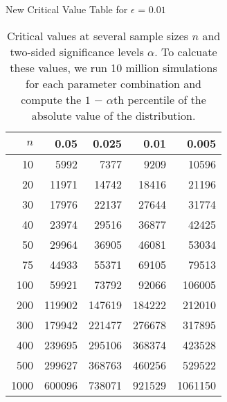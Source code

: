 \begin{table}[ht]
\centering
\caption{New Critical Value Table for $\epsilon$ = $0.01$}
\label{tab:crit_val_eps_.01}
\begin{tabular}{rrrrr}
  \hline
$n$ & 0.05 & 0.025 & 0.01 & 0.005 \\ 
  \hline
10 & 5992 & 7377 & 9209 & 10596 \\ 
  20 & 11971 & 14742 & 18416 & 21196 \\ 
  30 & 17976 & 22137 & 27644 & 31774 \\ 
  40 & 23974 & 29516 & 36877 & 42425 \\ 
  50 & 29964 & 36905 & 46081 & 53034 \\ 
  75 & 44933 & 55371 & 69105 & 79513 \\ 
  100 & 59921 & 73792 & 92066 & 106005 \\ 
  200 & 119902 & 147619 & 184222 & 212010 \\ 
  300 & 179942 & 221477 & 276678 & 317895 \\ 
  400 & 239695 & 295106 & 368374 & 423528 \\ 
  500 & 299627 & 368763 & 460256 & 529522 \\ 
  1000 & 600096 & 738071 & 921529 & 1061150 \\ 
   \hline
\end{tabular}
\\[10pt]
\caption*{Critical values at several sample sizes $n$ and two-sided significance levels $\alpha$. To calcuate these values, we run 10 million simulations for each parameter combination and compute the $1$ $-$ $\alpha$th percentile of the absolute value of the distribution.}
\end{table}
